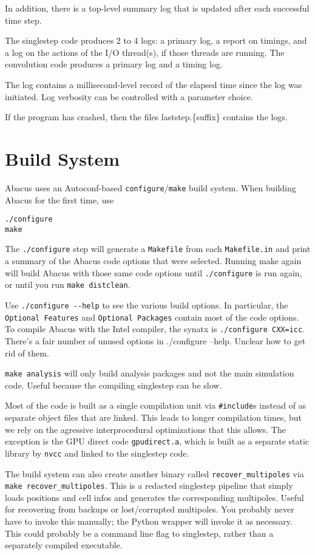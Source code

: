 \documentclass[11pt,preprint]{aastex}
\newcommand{\todo}{}
\newenvironment{private}{\comment}{\endcomment}
\newcommand{\todo}[1]{{\bf TODO: #1}}
\newenvironment{private}
    {\textbf{Not public:}\\
    \begin{tabular}{|p{0.9\textwidth}|}
    \hline\\
    }
    {
    \\\\\hline
    \end{tabular}
    }
\begin{document}
\todo{In addition, there is a top-level summary log that is updated
after each successful time step.}

The singlestep code produces 2 to 4 logs: a primary log, a report
on timings, and a log on the actions of the I/O thread(s), if those
threads are running.  The convolution code produces a primary log
and a timing log.

The log contains a millisecond-level record of the elapsed time
since the log was initiated.  Log verbosity can be controlled with
a parameter choice.

If the program has crashed, then the files laststep.\{suffix\} contains
the logs.

\begin{private}
\section{Build System}
Abacus uses an Autoconf-based \texttt{configure}/\texttt{make} build system.
When building Abacus for the first time, use
\begin{verbatim}
./configure
make
\end{verbatim}
The \verb|./configure| step will generate a \verb|Makefile| from each \verb|Makefile.in|
and print a summary of the Abacus code options
that were selected.  Running make again will build Abacus with those same code
options until \verb|./configure| is run again, or until you run \verb|make distclean|.

Use \verb|./configure --help| to see the various build options.  In particular,
the \verb|Optional Features| and \verb|Optional Packages| contain most of the code
options.  To compile Abacus with the Intel compiler, the synatx is \verb|./configure CXX=icc|.
\todo{There's a fair number of unused options in ./configure --help.  Unclear
how to get rid of them.}

\verb|make analysis| will only build analysis packages and not the main simulation
code.  Useful because the compiling singlestep can be slow.

Most of the code is built as a single compilation unit via \verb|#include|s instead
of as separate object files that are linked.  This leads to longer compilation times,
but we rely on the agressive interprocedural optimizations that this allows.
The exception is the GPU direct code \verb|gpudirect.a|, which is built as a separate
static library by \verb|nvcc| and linked to the singlestep code.

The build system can also create another binary called \verb|recover_multipoles| via
\verb|make recover_multipoles|.  This is a redacted singlestep pipeline that simply loads positions
and cell infos and generates the corresponding multipoles.  Useful for recovering from
backups or lost/corrupted multipoles.  You probably never have to invoke this manually;
the Python wrapper will invoke it as necessary.
\todo{This could probably be a command line flag to singlestep, rather than a
separately compiled executable.}

\end{private}
\end{document}
